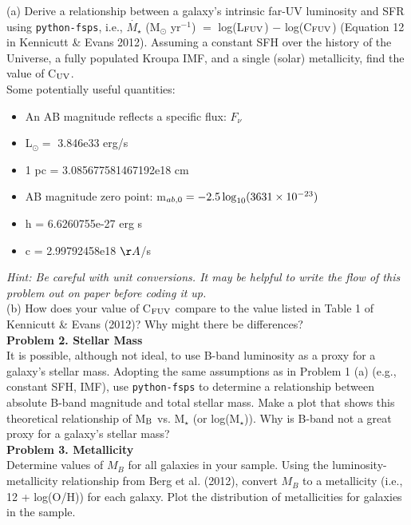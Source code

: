 \documentclass{article}
\begin{document}
(a) Derive a relationship between a galaxy's intrinsic far-UV luminosity and SFR using \texttt{python-fsps}, i.e., $\dot{M_{\star}}$ (M$_{\odot}$ yr$^{-1}$) $=$ log(L$_{\rm FUV}$) $-$ log(C$_{\rm FUV}$) (Equation 12 in Kennicutt \& Evans 2012).  Assuming a constant SFH over the history of the Universe, a fully populated Kroupa IMF, and a single (solar) metallicity, find the value of C$_{\rm UV}$. \\

\noindent Some potentially useful quantities:

 \begin{itemize}
\item An AB magnitude reflects a specific flux: $F_{\nu}$
\item L$_{\odot} =$ 3.846e33 erg/s
\item 1 pc = 3.085677581467192e18 cm
\item AB magnitude zero point: m$_{ab,0} = -2.5\, {\rm log}_{10}(3631\times10^{-23})$
\item h = 6.6260755e-27 erg s
\item c = 2.99792458e18 $\AA$/s
\end{itemize}

\noindent \textit{Hint: Be careful with unit conversions.  It may be helpful to write the flow of this problem out on paper before coding it up.} \\

(b) How does your value of C$_{\rm FUV}$ compare to the value listed in Table 1 of Kennicutt \& Evans (2012)?  Why might there be differences? \\

\noindent \textbf{Problem 2. Stellar Mass} \\

It is possible, although not ideal, to use B-band luminosity as a proxy for a galaxy's stellar mass. Adopting the same assumptions as in Problem 1 (a) (e.g., constant SFH, IMF), use \texttt{python-fsps} to determine a relationship between absolute B-band magnitude and total stellar mass.  Make a plot that shows this theoretical relationship of M$_{\rm B}$ vs. M$_{\star}$ (or log(M$_{\star}$)).  Why is B-band not a great proxy for a galaxy's stellar mass? \\

\noindent \textbf{Problem 3. Metallicity} \\

Determine values of $M_B$ for all galaxies in your sample.  Using the luminosity-metallicity relationship from Berg et al. (2012), convert $M_B$ to a metallicity (i.e., 12 + log(O/H)) for each galaxy.  Plot the distribution of metallicities for galaxies in the sample.  \\
\end{document}
